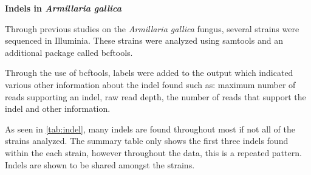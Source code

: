 \documentclass[../main.tex]{subfiles}
\begin{document}
\textbf{Indels in \textit{Armillaria gallica}}

Through previous studies on the \textit{Armillaria gallica} fungus, several strains were sequenced in Illuminia. These strains were analyzed using samtools and an additional package called bcftools. 

Through the use of bcftools, labels were added to the output which indicated various other information about the indel found such as: maximum number of reads supporting an indel, raw read depth, the number of reads that support the indel and other information.

As seen in \ref{tab:indel}, many indels are found throughout most if not all of the strains analyzed. The summary table only shows the first three indels found within the each strain, however throughout the data, this is a repeated pattern. Indels are shown to be shared amongst the strains. 
\end{document}
